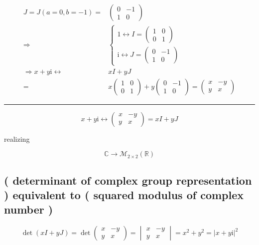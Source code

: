 \documentclass[
]{book}
\theoremstyle{definition}
\theoremstyle{definition}
\theoremstyle{definition}
\theoremstyle{definition}
\theoremstyle{remark}
\begin{document}
\[
\begin{aligned}
J=J\left(a=0,b=-1\right)= & \begin{pmatrix}0 & -1\\
1 & 0
\end{pmatrix}\\
\Rightarrow & \begin{cases}
1\leftrightarrow I=\begin{pmatrix}1 & 0\\
0 & 1
\end{pmatrix}\\
\mathrm{i}\leftrightarrow J=\begin{pmatrix}0 & -1\\
1 & 0
\end{pmatrix}
\end{cases}\\
\Rightarrow x+y\mathrm{i}\leftrightarrow & xI+yJ\\
= & x\begin{pmatrix}1 & 0\\
0 & 1
\end{pmatrix}+y\begin{pmatrix}0 & -1\\
1 & 0
\end{pmatrix}=\begin{pmatrix}x & -y\\
y & x
\end{pmatrix}
\end{aligned}
\]

\begin{center}\rule{0.5\linewidth}{0.5pt}\end{center}

\[
x+y\mathrm{i}\leftrightarrow\begin{pmatrix}x & -y\\
y & x
\end{pmatrix}=xI+yJ
\]

realizing

\[
\mathbb{C}\rightarrow\mathcal{M}_{2\times2}\left(\mathbb{R}\right)
\]

\subsection{( determinant of complex group representation ) equivalent to ( squared modulus of complex number )}\label{determinant-of-complex-group-representation-equivalent-to-squared-modulus-of-complex-number}

\[
\det\left(xI+yJ\right)=\det\begin{pmatrix}x & -y\\
y & x
\end{pmatrix}=\begin{vmatrix}x & -y\\
y & x
\end{vmatrix}=x^{2}+y^{2}=\left|x+y\mathrm{i}\right|^{2}
\]
\end{document}
